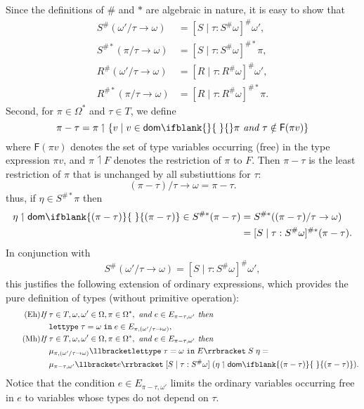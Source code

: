 \documentclass[sigplan,screen,nonacm,balance=false]{acmart}
\theoremstyle{plain}
\DeclarePairedDelimiter{\set}{\{}{\}}
\DeclarePairedDelimiter{\interp}{\llbracket}{\rrbracket}
\newcommand{\lettypein}[3]{\mathtt{lettype} \; #1 = #2 \; \mathtt{in} \; #3}
\newcommand{\dom}[1]{\mathsf{dom}\ifblank{#1}{\;}{#1}}
\newcommand{\FV}{\mathsf{F}}
\begin{document}
Since the definitions of $\#$ and $*$ are algebraic in nature, it is easy to show that
%
\begin{align*}
  S^\#(\omega'/\tau \to \omega) &= [S \mid \tau : S^\# \omega]^\# \omega', \\
  S^{\#*}(\pi/\tau \to \omega) &= [S \mid \tau : S^\# \omega]^{\#*} \pi, \\
  R^\#(\omega'/\tau \to \omega) &= [R \mid \tau : R^\# \omega]^\# \omega', \\
  R^{\#*}(\pi/\tau \to \omega) &= [R \mid \tau : R^\# \omega]^{\#*} \pi.
\end{align*}
%
Second, for $\pi \in \Omega^*$ and $\tau \in T$, we define
%
\begin{equation*}
  \pi - \tau = \pi \upharpoonleft \set{v \mid v \in \dom{} \pi \textit{ and } \tau \notin \FV(\pi v)}
\end{equation*}
%
where $\FV(\pi v)$ denotes the set of type variables occurring (free) in the type expression $\pi v$, and $\pi \upharpoonleft F$ denotes the restriction of $\pi$ to $F$.
Then $\pi - \tau$ is the least restriction of $\pi$ that is unchanged by all substiuttions for $\tau$:
%
\begin{equation*}
  (\pi - \tau)/\tau \to \omega = \pi - \tau.
\end{equation*}
%
thus, if $\eta \in S^{\#*} \pi$ then
%
\begin{align*}
  \eta \upharpoonleft \dom{(\pi - \tau)} \in S^{\#*}(\pi - \tau) &= S^{\#*}((\pi - \tau)/\tau \to \omega) \\
  &= [S \mid \tau : S^\# \omega]^{\#*} (\pi - \tau).
\end{align*}
%
In conjunction with
%
\begin{equation*}
  S^\#(\omega'/\tau \to \omega) = [S \mid \tau : S^\# \omega]^\# \omega',
\end{equation*}
%
this justifies the following extension of ordinary expressions, which provides the pure definition of types (without primitive operation):
%
\begin{align}
  \tag{Eh}
  \textit{If } & \tau \in T, \omega, \omega' \in \Omega, \pi \in \Omega^*, \textit{ and } e \in E_{\pi - \tau, \omega'} \textit{ then } \\
  \nonumber
  & \lettypein{\tau}{\omega}{e} \in E_{\pi, (\omega'/\tau \to \omega)}, \\
  \tag{Mh}
  \textit{If } & \tau \in T, \omega, \omega' \in \Omega, \pi \in \Omega^*, \textit{ and } e \in E_{\pi - \tau, \omega'} \textit{ then } \\
  \nonumber
  & \mu_{\pi, (\omega'/\tau \to \omega)} \interp{\lettypein{\tau}{\omega}{E}} \; S \; \eta = \\
  \nonumber
  & \mu_{\pi - \tau, \omega'} \interp{e} \; [S \mid \tau : S^\# \omega] \; (\eta \upharpoonleft \dom{(\pi - \tau)}).
\end{align}
%
Notice that the condition $e \in E_{\pi - \tau, \omega'}$ limits the ordinary variables occurring free in $e$ to variables whose types do not depend on $\tau$.
\end{document}
